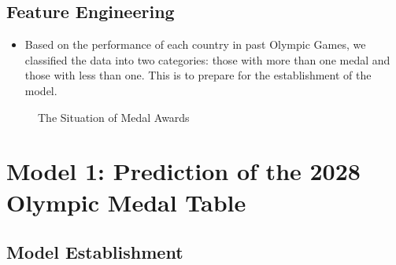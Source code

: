 \documentclass{mcmthesis}  %
\begin{document}
\subsection{Feature Engineering}  %
\begin{itemize}  %
\item Based on the performance of each country in past Olympic Games, we classified the data into two categories: those with more than one medal and those with less than one. This is to prepare for the establishment of the model.
\end{itemize}  %
\begin{figure}[H]
\centering
{}
\hfill
{}
\caption{The Situation of Medal Awards}
\label{fig:sidebyside}
\end{figure}
\section{Model 1: Prediction of the 2028 Olympic Medal Table}  %

\subsection{Model Establishment}  %
\end{document}
